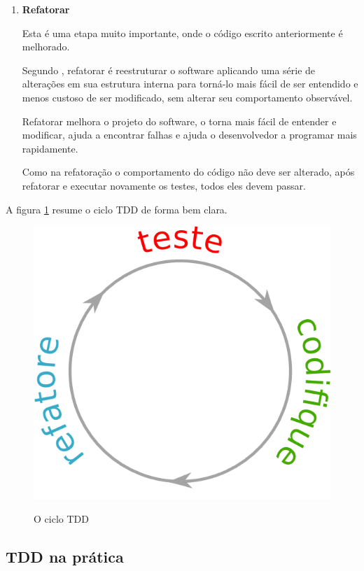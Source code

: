 \begin{enumerate}
\item \textbf{Refatorar}

Esta é uma etapa muito importante, onde o código escrito anteriormente é melhorado.

Segundo , refatorar é reestruturar o software aplicando uma série de alterações em sua estrutura interna para torná-lo mais fácil de ser entendido e menos custoso de ser modificado, sem alterar seu comportamento observável.

Refatorar melhora o projeto do software, o torna mais fácil de entender e modificar, ajuda a encontrar falhas e ajuda o desenvolvedor a programar mais rapidamente.

Como na refatoração o comportamento do código não deve ser alterado, após refatorar e executar novamente os testes, todos eles devem passar.

\end{enumerate}

A figura \ref{img:ciclo-tdd} resume o ciclo TDD de forma bem clara.

\begin{figure}[h]
  \center
  \caption{O ciclo TDD}
  \includegraphics[scale=0.45]{images/ciclo-tdd}
  \label{img:ciclo-tdd}
\end{figure}

\subsection{TDD na prática}
\label{ssub:tdd_na_pratica}

